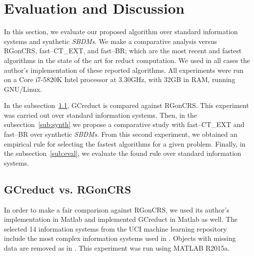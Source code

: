 \documentclass[authoryear,preprint,review,12pt]{elsarticle}
\begin{document}
%	
\section{Evaluation and Discussion}\label{evaluation}
	In this section, we evaluate our proposed algorithm over standard information systems and synthetic \textit{SBDMs}. We make a comparative analysis versus RGonCRS, fast--CT\_EXT, and fast--BR; which are the most recent and fastest algorithms in the state of the art for reduct computation. We used in all cases the author's implementation of these reported algorithms. All experiments were run on a Core i7-5820K Intel processor at 3.30GHz, with 32GB in RAM, running GNU/Linux.
	
	In the subsection~\ref{sub:matlab}, GCreduct is compared against RGonCRS. This experiment was carried out over standard information systems. Then, in the subsection~\ref{sub:synth} we propose a comparative study with fast--CT\_EXT and fast--BR over synthetic \textit{SBDMs}. From this second experiment, we obtained an empirical rule for selecting the fastest algorithms for a given problem. Finally, in the  subsection~\ref{sub:eval}, we evaluate the found rule over standard information systems.
	
\subsection{GCreduct vs. RGonCRS}\label{sub:matlab}
	In order to make a fair comparison against RGonCRS, we used its author's implementation in Matlab and implemented GCreduct in Matlab as well. The selected 14 information systems from the UCI machine learning repository \citep{Bache13} include the most complex information systems used in \citep{Lias13,Sanchez10,WangP07}. Objects with missing data are removed as in \citep{WangP07}. This experiment was run using MATLAB R2015a.
	
\end{document}
